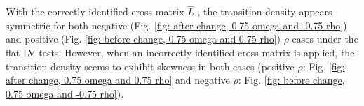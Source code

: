 \documentclass[12pt]{article}
\begin{document}
With the correctly identified cross matrix $\hat L$ , the transition density appears symmetric for both negative (Fig. \ref{fig: after change, 0.75 omega and -0.75 rho}) and positive (Fig. \ref{fig: before change, 0.75 omega and 0.75 rho}) $\rho$ cases under the flat LV tests. However, when an incorrectly identified cross matrix is applied, the transition density seems to exhibit skewness in both cases (positive $\rho$: Fig. \ref{fig: after change, 0.75 omega and 0.75 rho} and negative $\rho$: Fig. \ref{fig: before change, 0.75 omega and -0.75 rho}).
\end{document}
